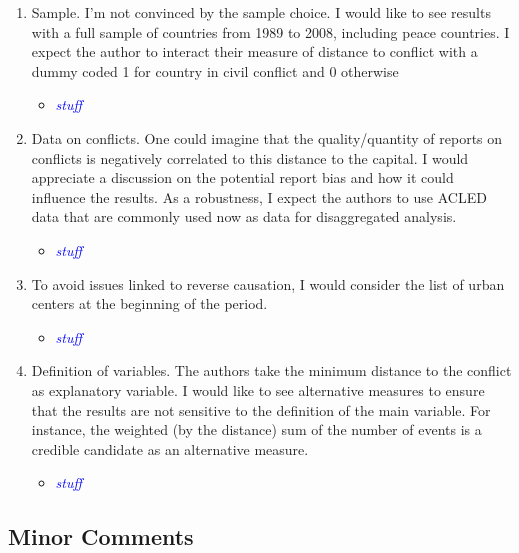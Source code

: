 \documentclass[12pt,onesided,fullpage]{amsart}
\begin{document}
\begin{enumerate}
\item Sample. I’m not convinced by the sample choice. I would like to see results with a full sample of countries from 1989 to 2008, including peace countries. I expect the author to interact their measure of distance to conflict with a dummy coded 1 for country in civil conflict and 0 otherwise

\begin{itemize}
\item \textcolor{blue}{\emph{stuff}}
\end{itemize}

\item Data on conflicts. One could imagine that the quality/quantity of reports on conflicts is negatively correlated to this distance to the capital. I would appreciate a discussion on the potential report bias and how it could influence the results. As a robustness, I expect the authors to use ACLED data that are commonly used now as data for disaggregated analysis.

\begin{itemize}
\item \textcolor{blue}{\emph{stuff}}
\end{itemize}

\item To avoid issues linked to reverse causation, I would consider the list of urban centers
at the beginning of the period.

\begin{itemize}
\item \textcolor{blue}{\emph{stuff}}
\end{itemize}

\item Definition of variables. The authors take the minimum distance to the conflict as explanatory variable. I would like to see alternative measures to ensure that the results are not sensitive to the definition of the main variable. For instance, the weighted (by the distance) sum of the number of events is a credible candidate as an alternative measure.

\begin{itemize}
\item \textcolor{blue}{\emph{stuff}}
\end{itemize}

\end{enumerate}

\subsection{Minor Comments}
\end{document}
